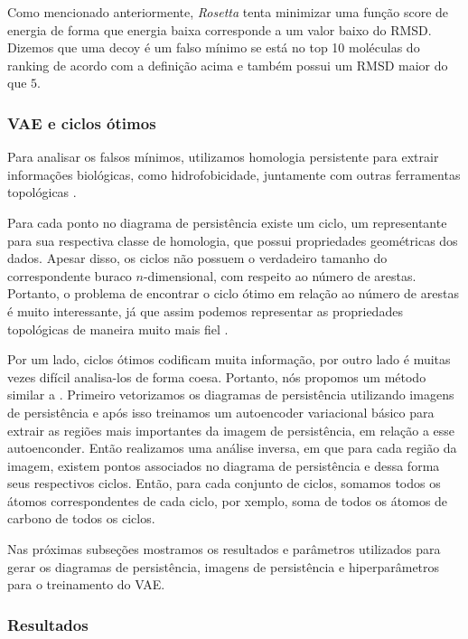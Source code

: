 Como mencionado anteriormente, \textit{Rosetta} tenta minimizar uma função score de energia de forma
que energia baixa corresponde a um valor baixo do RMSD. Dizemos que uma decoy é um falso mínimo
se está no top 10 moléculas do ranking de acordo com a definição acima e também possui um RMSD maior
do que $5$.

\subsubsection{VAE e ciclos ótimos}

Para analisar os falsos mínimos, utilizamos homologia persistente \cite{Edelsbrunner2002} para extrair
informações biológicas, como hidrofobicidade, juntamente com outras ferramentas topológicas \cite{Cang2017}.

Para cada ponto no diagrama de persistência existe um ciclo, um representante para sua respectiva classe
de homologia, que possui propriedades geométricas dos dados. Apesar disso, os ciclos não possuem o
verdadeiro tamanho do correspondente buraco $n$-dimensional, com respeito ao número de arestas. Portanto,
o problema de encontrar o ciclo ótimo em relação ao número de arestas é muito interessante, já que assim
podemos representar as propriedades topológicas de maneira muito mais fiel \cite{Escolar2015}.

Por um lado, ciclos ótimos codificam muita informação, por outro lado é muitas vezes difícil analisa-los
de forma coesa. Portanto, nós propomos um método similar a \cite{Obayashi2018}. Primeiro vetorizamos
os diagramas de persistência utilizando imagens de persistência \cite{Adams2017} e após isso treinamos
um autoencoder variacional básico \cite{kingma2013} para extrair as regiões mais importantes
da imagem de persistência, em relação a esse autoenconder. Então realizamos uma análise inversa, em que para
cada região da imagem, existem pontos associados no diagrama de persistência e dessa forma seus
respectivos ciclos. Então, para cada conjunto de ciclos, somamos todos os átomos correspondentes de
cada ciclo, por xemplo, soma de todos os átomos de carbono de todos os ciclos. 

Nas próximas subseções
mostramos os resultados e parâmetros utilizados para gerar os diagramas de persistência, imagens
de persistência e hiperparâmetros para o treinamento do VAE.

\subsubsection{Resultados}

